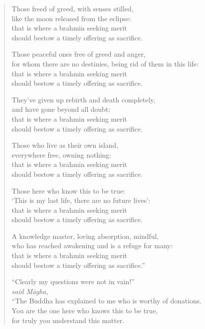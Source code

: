 \documentclass[12pt,openany]{book}%
\newcommand*{\scspeaker}[1]{\hspace{2em}\textit{#1}}
\begin{document}
\begin{verse}
Those freed of greed, with senses stilled, \\
like the moon released from the eclipse: \\
that is where a brahmin seeking merit \\
should bestow a timely offering as sacrifice. 

Those peaceful ones free of greed and anger, \\
for whom there are no destinies, being rid of them in this life: \\
that is where a brahmin seeking merit \\
should bestow a timely offering as sacrifice. 

They’ve given up rebirth and death completely, \\
and have gone beyond all doubt: \\
that is where a brahmin seeking merit \\
should bestow a timely offering as sacrifice. 

Those who live as their own island, \\
everywhere free, owning nothing: \\
that is where a brahmin seeking merit \\
should bestow a timely offering as sacrifice. 

Those here who know this to be true: \\
‘This is my last life, there are no future lives’: \\
that is where a brahmin seeking merit \\
should bestow a timely offering as sacrifice. 

A knowledge master, loving absorption, mindful, \\
who has reached awakening and is a refuge for many: \\
that is where a brahmin seeking merit \\
should bestow a timely offering as sacrifice.” 

“Clearly my questions were not in vain!” \\
\scspeaker{said \textsanskrit{Māgha}, }\\
“The Buddha has explained to me who is worthy of donations. \\
You are the one here who knows this to be true, \\
for truly you understand this matter. 


\end{verse}
\end{document}
